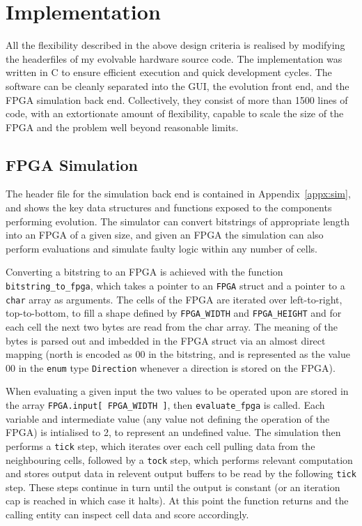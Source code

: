 \section{Implementation}
All the flexibility described in the above design criteria is realised by modifying
the headerfiles of my evolvable hardware source code. The implementation was written
in C to ensure efficient execution and quick development cycles. The software can
be cleanly separated into the GUI, the evolution front end, and the FPGA
simulation back end. Collectively, they consist of more than 1500 lines of code, with
an extortionate amount of flexibility, capable to scale the size of the FPGA and the
problem well beyond reasonable limits.

\subsection{FPGA Simulation}
The header file for the simulation back end is contained in Appendix~\ref{appx:sim}, and shows the
key data structures and functions exposed to the components performing evolution.
The simulator can convert bitstrings of appropriate length into an FPGA of a
given size, and given an FPGA the simulation can also perform evaluations and
simulate faulty logic within any number of cells.

Converting a bitstring to an FPGA is achieved with the function \texttt{bitstring\_to\_fpga},
which takes a pointer to an \texttt{FPGA} struct and a pointer to a \texttt{char} array as arguments.
The cells of the FPGA are iterated over left-to-right, top-to-bottom, to fill a shape defined
by \texttt{FPGA\_WIDTH} and \texttt{FPGA\_HEIGHT} and for each cell the next two
bytes are read from the char array. The meaning of the bytes is parsed out and imbedded
in the FPGA struct via an almost direct mapping (north is encoded as 00 in the bitstring,
and is represented as the value 00 in the \texttt{enum} type \texttt{Direction} whenever
a direction is stored on the FPGA).

When evaluating a given input the two values to be operated upon are stored in
the array \texttt{FPGA.input[ FPGA\_WIDTH ]}, then \texttt{evaluate\_fpga} is called.
Each variable and intermediate value
(any value not defining the operation of the FPGA) is intialised to 2, to represent
an undefined value. The simulation then performs a \texttt{tick} step, which iterates over each
cell pulling data from the neighbouring cells, followed by a \texttt{tock} step, which performs
relevant computation and stores output data in relevent output buffers to be read by
the following \texttt{tick} step. These steps continue in turn
until the output is constant (or an iteration cap is reached in which case it halts).
At this point the function returns and the calling entity can inspect cell data and
score accordingly.

